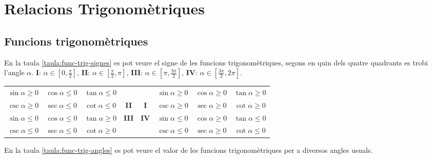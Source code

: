 \chapter{Relacions Trigonomètriques}

\section{Funcions trigonomètriques}

En la taula \vref{taula:func-trig-signes} es pot veure el signe de
les funcions trigonomètriques, segons en quin dels quatre quadrants
es trobi l'angle $\alpha$. \textbf{I}: $\alpha\in[0,\frac{\pi}{2}]$, \textbf{II}:
$\alpha\in[\frac{\pi}{2},\pi]$, \textbf{III}:
$\alpha\in[\pi,\frac{3\pi}{2}]$, \textbf{IV}:
$\alpha\in[\frac{3\pi}{2},2\pi]$.

\begin{center}
   \label{taula:func-trig-signes}
   \begin{tabular}{cccc|cccc}
   {\color{Green}$\sin\alpha \geq 0$} & {\color{Red}$\cos\alpha \leq 0$} & {\color{Red}$\tan\alpha \leq 0$} & & &
   {\color{Green}$\sin\alpha \geq 0$} & {\color{Green}$\cos\alpha \geq 0$} & {\color{Green}$\tan\alpha \geq 0$} \\
   {\color{Green}$\csc\alpha \geq 0$} & {\color{Red}$\sec\alpha \leq 0$} & {\color{Red}$\cot\alpha \leq 0$} & \textbf{II}&
   \textbf{I} & {\color{Green}$\csc\alpha \geq 0$} & {\color{Green}$\sec\alpha \geq 0$} & {\color{Green}$\cot\alpha \geq 0$} \\
   \hline
   {\color{Red}$\sin\alpha \leq 0$} & {\color{Red}$\cos\alpha \leq 0$} & {\color{Green}$\tan\alpha \geq 0$}
   &\textbf{III} &
   \textbf{IV} & {\color{Red}$\sin\alpha \leq 0$} & {\color{Green}$\cos\alpha \geq 0$} & {\color{Red}$\tan\alpha \leq 0$} \\
   {\color{Red}$\csc\alpha \leq 0$} & {\color{Red}$\sec\alpha \leq 0$} & {\color{Green}$\cot\alpha \geq 0$}  & & &
   {\color{Red}$\csc\alpha \leq 0$} & {\color{Green}$\sec\alpha \geq 0$} & {\color{Red}$\cot\alpha \leq 0$}
   \end{tabular}
\end{center}

En la taula \vref{taula:func-trig-angles} es pot veure el valor de
les funcions trigonomètriques per a diversos angles usuals.


